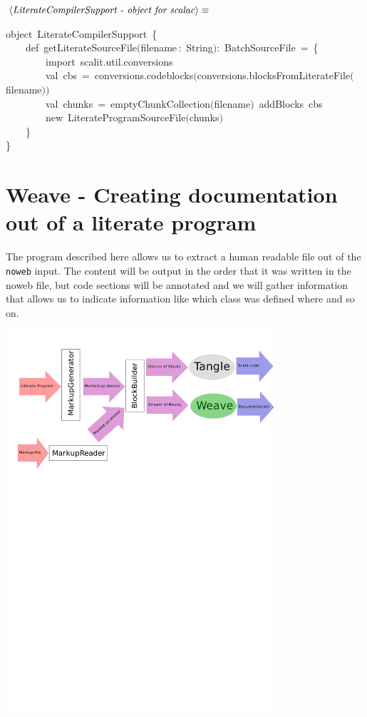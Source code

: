 \documentclass[a4paper,12pt]{article}
\begin{document}
$\left<\mbox{\emph{LiterateCompilerSupport - object for scalac}}\right>\equiv$
\begin{program}{\vem object}~LiterateCompilerSupport~{\small\{}
\\~~~~{\vem def}~getLiterateSourceFile$($filename\,{\rm :}~String$)${\rm :}~BatchSourceFile~=~{\small\{}
\\~~~~~~~~{\vem import}~scalit.util.conversions
\\~~~~~~~~{\vem val}~cbs~=~conversions.codeblocks$($conversions.blocksFromLiterateFile$($filename$)$$)$
\\~~~~~~~~{\vem val}~chunks~=~emptyChunkCollection$($filename$)$~addBlocks~cbs
\\~~~~~~~~{\vem new}~LiterateProgramSourceFile$($chunks$)$
\\~~~~{\small\}}
\\{\small\}}
\end{program}
\section{Weave - Creating documentation out of a literate program}
The program described here allows us to extract a human readable file
out of the \texttt{noweb} input. The content will be output in the order that
it was written in the noweb file, but code sections will be annotated and
we will gather information that allows us to indicate information like
which class was defined where and so on.

\includegraphics[width=10cm,viewport=310 610 600 710,clip]{images/weave}
\end{document}
